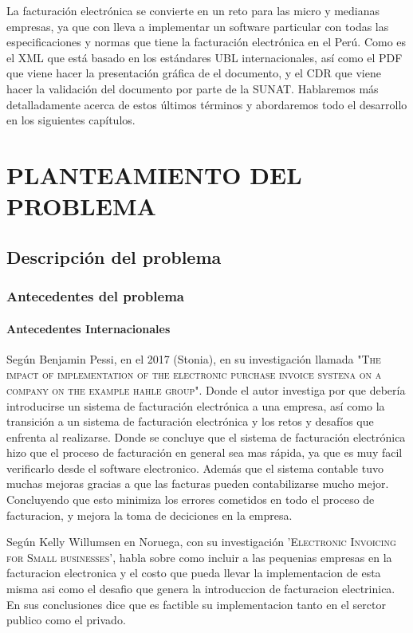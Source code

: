 \documentclass[12pt,a4paper,openany,oneside]{book}
\begin{document}
    La facturación electrónica se convierte en un reto para las micro y medianas empresas, ya que con lleva a implementar un software particular con todas las especificaciones y normas que tiene la facturación electrónica en el Perú. Como es el XML que está basado en los estándares UBL internacionales, así como el PDF que viene hacer la presentación gráfica de el documento, y el CDR que viene hacer la validación del documento por parte de la SUNAT. Hablaremos más detalladamente acerca de estos últimos términos y abordaremos todo el desarrollo en los siguientes capítulos.

    \mainmatter
    \chapter{PLANTEAMIENTO DEL PROBLEMA}
        \section{Descripción del problema}
            \subsection{Antecedentes del problema}
                \subsubsection{Antecedentes Internacionales}
                Según Benjamin Pessi, en el 2017 (Stonia), en su investigación llamada \textsc{"The impact of implementation of the electronic purchase invoice systena on a company on the example hahle group"}. Donde el autor investiga por que debería introducirse un sistema de facturación electrónica a una empresa, así como la transición a un sistema de facturación electrónica y los retos y desafíos que enfrenta al realizarse.  
                Donde se concluye que el sistema de facturación electrónica hizo que el proceso de  facturación en general sea mas rápida, ya que es muy facil verificarlo desde el software electronico. Además que el sistema contable tuvo muchas mejoras gracias a que las facturas pueden contabilizarse mucho mejor. Concluyendo que esto minimiza los errores cometidos en todo el proceso de facturacion, y mejora la toma de deciciones en la empresa.
                
                Según Kelly Willumsen en Noruega, con su investigación \textsc {'Electronic Invoicing for Small businesses'}, habla sobre como incluir a las pequenias empresas en la facturacion electronica y el costo que pueda llevar la implementacion de esta misma asi como el desafio que genera la introduccion de facturacion electrinica. En sus conclusiones dice que es factible su implementacion tanto en el serctor publico como el privado.
                
\end{document}
